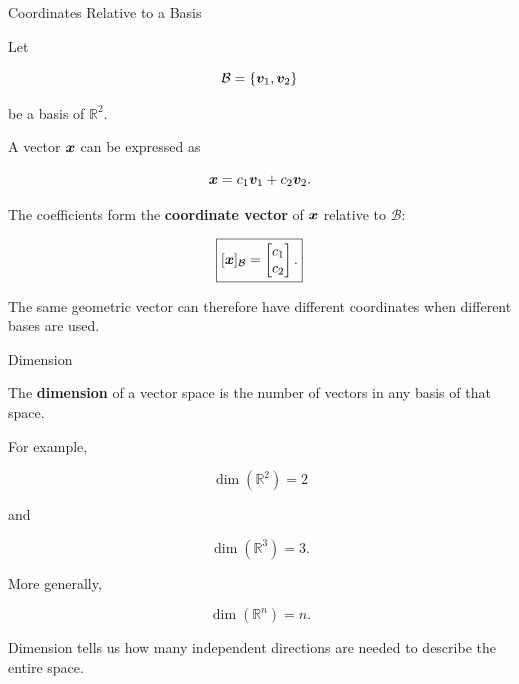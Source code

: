 
\begin{frame}{Coordinates Relative to a Basis}

Let

\[
\mathcal{B}
=
\{\bm{v}_1,\bm{v}_2\}
\]

be a basis of $\mathbb{R}^2$.

A vector $\bm{x}$ can be expressed as

\[
\bm{x}
=
c_1\bm{v}_1+c_2\bm{v}_2.
\]

The coefficients form the \textbf{coordinate vector} of $\bm{x}$
relative to $\mathcal{B}$:

\[
\boxed{
[\bm{x}]_{\mathcal{B}}
=
\begin{bmatrix}
c_1\\
c_2
\end{bmatrix}.
}
\]

\vspace{0.3cm}

The same geometric vector can therefore have different coordinates
when different bases are used.

\end{frame}



\begin{frame}{Dimension}

The \textbf{dimension} of a vector space is the number of vectors
in any basis of that space.

For example,

\[
\boxed{
\dim(\mathbb{R}^2)=2
}
\]

and

\[
\boxed{
\dim(\mathbb{R}^3)=3.
}
\]

\vspace{0.5cm}

More generally,

\[
\boxed{
\dim(\mathbb{R}^n)=n.
}
\]

Dimension tells us how many independent directions are needed
to describe the entire space.

\end{frame}



